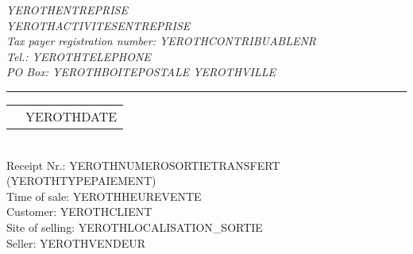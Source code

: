 \documentclass[1.75pt]{article} %
\makeatletter
\newcommand{\headerrow}[2]
{\begin{tabular*}{\linewidth}{l@{\extracolsep{\fill}}r}
	#1 &
	#2 \\
\end{tabular*}}
\makeatother
\begin{document}
\emph{YEROTHENTREPRISE} \\
\emph{YEROTHACTIVITESENTREPRISE} \\
\emph{Tax payer registration number: YEROTHCONTRIBUABLENR} \\
\emph{Tel.: YEROTHTELEPHONE} \\
\emph{PO Box: YEROTHBOITEPOSTALE YEROTHVILLE}

\vspace*{0.2cm}

\hrule

\headerrow
{}
{YEROTHDATE}\\

Receipt Nr.: YEROTHNUMEROSORTIETRANSFERT (YEROTHTYPEPAIEMENT)\\
Time of sale: YEROTHHEUREVENTE\\
Customer: YEROTHCLIENT\\
Site of selling: YEROTHLOCALISATION_SORTIE\\
Seller: YEROTHVENDEUR

\vspace*{0.2cm}

\end{document}
